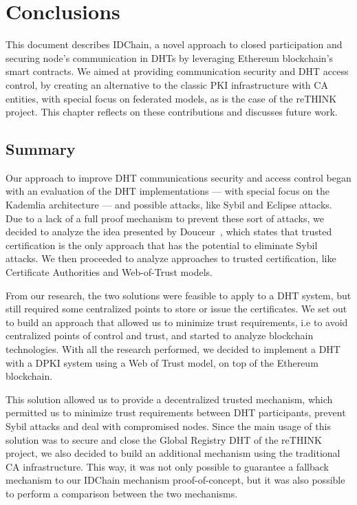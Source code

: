 \chapter{Conclusions}
\label{chapter:conclusion}

This document describes IDChain, a novel approach to closed participation and securing node's communication in DHTs by leveraging Ethereum blockchain's smart contracts.
We aimed at providing communication security and DHT access control, by creating an alternative to the classic PKI infrastructure with \acl{CA} entities, with special focus on federated models, as is the case of the reTHINK project.
This chapter reflects on these contributions and discusses future work.

\section{Summary}
\label{section:summary}
Our approach to improve DHT communications security and access control began with an evaluation of the DHT implementations — with special focus on the Kademlia architecture — and possible attacks, like Sybil and Eclipse attacks.
Due to a lack of a full proof mechanism to prevent these sort of attacks, we decided to analyze the idea presented by Douceur~\cite{Douceur2002}, which states that trusted certification is the only approach that has the potential to eliminate Sybil attacks.
We then proceeded to analyze approaches to trusted certification, like Certificate Authorities and Web-of-Trust models.

From our research, the two solutions were feasible to apply to a DHT system, but still required some centralized points to store or issue the certificates.
We set out to build an approach that allowed us to minimize trust requirements, i.e to avoid centralized points of control and trust, and started to analyze blockchain technologies.
With all the research performed, we decided to implement a DHT with a DPKI system using a Web of Trust model, on top of the Ethereum blockchain.

This solution allowed us to provide a decentralized trusted mechanism, which permitted us to minimize trust requirements between DHT participants, prevent Sybil attacks and deal with compromised nodes.
Since the main usage of this solution was to secure and close the Global Registry DHT of the reTHINK project, we also decided to build an additional mechanism using the traditional CA infrastructure.
This way, it was not only possible to guarantee a fallback mechanism to our IDChain mechanism proof-of-concept, but it was also possible to perform a comparison between the two mechanisms.

